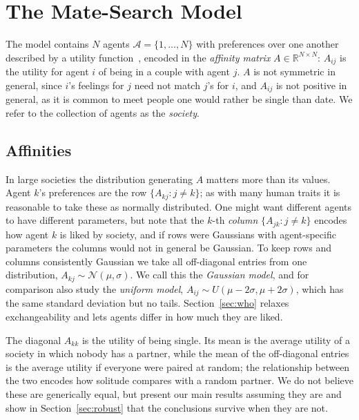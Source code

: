 \documentclass[sigconf,anonymous]{aamas}
\newcommand{\Ag}{\mathcal{A}}
\newcommand{\N}{\mathcal{N}}
\newcommand{\R}{\mathbb{R}}
\begin{document}

\section{The Mate-Search Model}
\label{sec:model}

The model contains $N$ agents $\Ag = \{1, \dots, N\}$ with preferences over one
another described by a utility function~\cite{mas1995microeconomic}, encoded in
the \emph{affinity matrix} $A \in \R^{N \times N}$: $A_{ij}$ is the utility for
agent $i$ of being in a couple with agent $j$. $A$ is not symmetric in general,
since $i$'s feelings for $j$ need not match $j$'s for $i$, and $A_{ij}$ is not
positive in general, as it is common to meet people one would rather be single
than date. We refer to the collection of agents as the \emph{society}.

\subsection{Affinities}
\label{sec:affinities}

In large societies the distribution generating $A$ matters more than its values.
Agent $k$'s preferences are the row $\{A_{kj} : j \neq k\}$; as with many human
traits it is reasonable to take these as normally distributed. One might want
different agents to have different parameters, but note that the $k$-th
\emph{column} $\{A_{jk} : j \neq k\}$ encodes how agent $k$ is liked by society,
and if rows were Gaussians with agent-specific parameters the columns would not
in general be Gaussian. To keep rows and columns consistently Gaussian we take
all off-diagonal entries from one distribution, $A_{kj} \sim \N(\mu, \sigma)$.
We call this the \emph{Gaussian model}, and for comparison also study the
\emph{uniform model}, $A_{ij} \sim U(\mu - 2\sigma, \mu + 2\sigma)$, which has
the same standard deviation but no tails. Section~\ref{sec:who} relaxes
exchangeability and lets agents differ in how much they are liked.

The diagonal $A_{kk}$ is the utility of being single. Its mean is the average
utility of a society in which nobody has a partner, while the mean of the
off-diagonal entries is the average utility if everyone were paired at random;
the relationship between the two encodes how solitude compares with a random
partner. We do not believe these are generically equal, but present our main
results assuming they are and show in Section~\ref{sec:robust} that the
conclusions survive when they are not.
\end{document}
